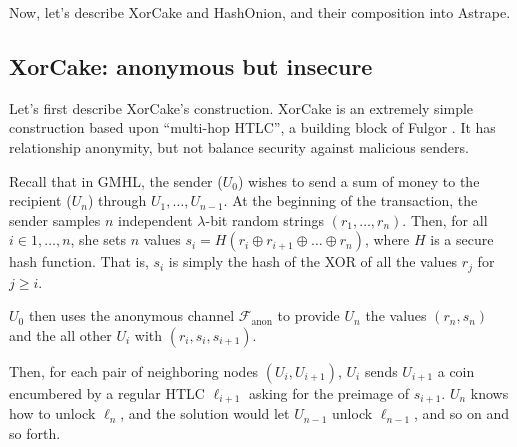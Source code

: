 \documentclass[USenglish,oneside,twocolumn]{article}
\begin{document}
Now, let's describe XorCake and HashOnion, and their composition into Astrape.

\subsection{XorCake: anonymous but insecure}

Let's first describe XorCake's construction. XorCake is an extremely simple construction based upon ``multi-hop HTLC'', a building block of Fulgor \cite{malavolta2017concurrency}. It has relationship anonymity, but not balance security against malicious senders.

Recall that in GMHL, the sender ($U_0$) wishes to send a sum of money to the recipient ($U_n$) through $U_1,\dots,U_{n-1}$. At the beginning of the transaction, the sender samples $n$ independent $\lambda$-bit random strings $(r_1,\dots,r_n)$. Then, for all $i\in1,\dots,n$, she sets $n$ values $s_i=H(r_i\oplus r_{i+1}\oplus\dots\oplus r_n)$, where $H$ is a secure hash function. That is, $s_i$ is simply the hash of the XOR of all the values $r_j$ for $j\geq i$.

$U_0$ then uses the anonymous channel $\mathcal{F}_\mathrm{anon}$ to provide $U_n$ the values $(r_n,s_n)$ and the all other $U_i$ with $(r_i,s_i,s_{i+1})$.

Then, for each pair of neighboring nodes $(U_i,U_{i+1})$, $U_i$ sends $U_{i+1}$ a coin encumbered by a regular HTLC $\ell_{i+1}$ asking for the preimage of $s_{i+1}$. $U_n$ knows how to unlock $\ell_n$, and the solution would let $U_{n-1}$ unlock $\ell_{n-1}$, and so on and so forth.


\end{document}
